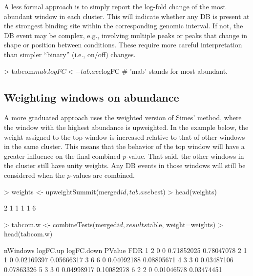 \documentclass[12pt]{report}
\renewenvironment{Schunk}{\vspace{0pt}}{\vspace{0pt}}
\begin{document}
A less formal approach is to simply report the log-fold change of the most abundant window in each cluster.
This will indicate whether any DB is present at the strongest binding site within the corresponding genomic interval.
If not, the DB event may be complex, e.g., involving multiple peaks or peaks that change in shape or position between conditions.
These require more careful interpretation than simpler ``binary'' (i.e., on/off) changes.

\begin{Schunk}
\begin{Sinput}
> tabcom$mab.logFC <- tab.ave$logFC # 'mab' stands for most abundant.
\end{Sinput}
\end{Schunk}

\subsection{Weighting windows on abundance}
A more graduated approach uses the weighted version of Simes' method, where the window with the highest abundance is upweighted.
In the example below, the weight assigned to the top window is increased relative to that of other windows in the same cluster.
This means that the behavior of the top window will have a greater influence on the final combined $p$-value.
That said, the other windows in the cluster still have unity weights.
Any DB events in those windows will still be considered when the $p$-values are combined.

\begin{Schunk}
\begin{Sinput}
> weights <- upweightSummit(merged$id, tab.ave$best)
> head(weights)
\end{Sinput}
\begin{Soutput}
[1] 2 1 1 1 1 6
\end{Soutput}
\begin{Sinput}
> tabcom.w <- combineTests(merged$id, results$table, weight=weights)
> head(tabcom.w)
\end{Sinput}
\begin{Soutput}
  nWindows logFC.up logFC.down     PValue        FDR
1        2        0          0 0.71852025 0.78047078
2        1        1          0 0.02169397 0.05666317
3        6        6          0 0.04092188 0.08805671
4        3        3          0 0.03487106 0.07863326
5        3        3          0 0.04998917 0.10082978
6        2        2          0 0.01046578 0.03474451
\end{Soutput}
\end{Schunk}
\end{document}
